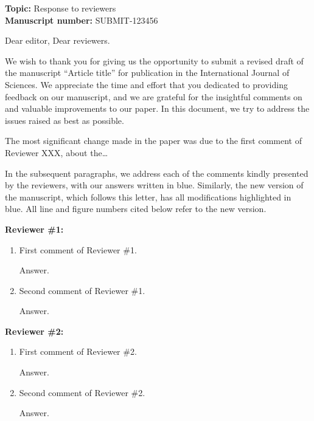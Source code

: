 \documentclass[11pt,a4paper,roman]{moderncv}
\begin{document}
\recipient{}{}
\date{\today}
\opening{}
\makelettertitle{}

\textbf{Topic:} Response to reviewers \\
\textbf{Manuscript number:} SUBMIT-123456

\vspace{0.5cm}

Dear editor, Dear reviewers.

\justify{}
We wish to thank you for giving us the opportunity to submit a revised draft of
the manuscript “Article title” for publication in the
International Journal of Sciences. We appreciate the time and effort
that you dedicated to providing feedback on our manuscript, and we are grateful
for the insightful comments on and valuable improvements to our paper. In this
document, we try to address the issues raised as best as possible.

The most significant change made in the paper was due to the first comment of
Reviewer XXX, about the\ldots

In the subsequent paragraphs, we address each of the comments kindly presented
by the reviewers, with our answers written in blue. Similarly, the new version
of the manuscript, which follows this letter, has all modifications highlighted
in blue. All line and figure numbers cited below refer to the new version.

\vspace{0.5cm}

\textbf{Reviewer \#1:}

\vspace{0.3cm}
\begin{enumerate}
  \item First comment of Reviewer \#1.

  \vspace{0.3cm}
    \color{blue}
    Answer.
    \color{black}
  \vspace{0.3cm}

  \item Second comment of Reviewer \#1.

  \vspace{0.3cm}
    \color{blue}
    Answer.
    \color{black}
  \vspace{0.3cm}

\end{enumerate}

\vspace{0.5cm}

\textbf{Reviewer \#2:}
\begin{enumerate}
  \item First comment of Reviewer \#2.

  \vspace{0.3cm}
    \color{blue}
    Answer.
    \color{black}
  \vspace{0.3cm}

  \item Second comment of Reviewer \#2.

  \vspace{0.3cm}
    \color{blue}
    Answer.
    \color{black}
  \vspace{0.3cm}

\end{enumerate}
\end{document}
